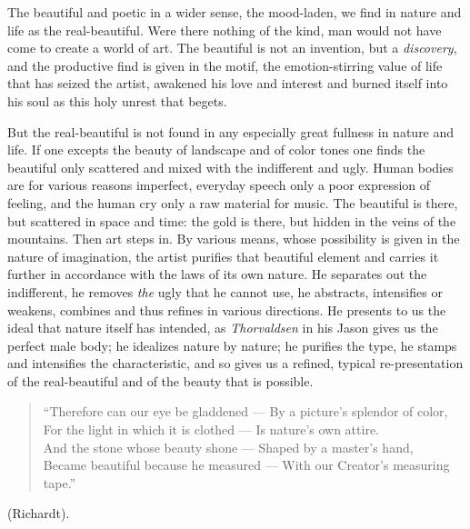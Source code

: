 \documentclass[12pt,a4paper,openany]{book}
\newcommand{\opage}[1]{\marginnote{\footnotesize\textit{[#1]}}}
\newenvironment{smallquote}{\begin{quote}}{\end{quote}}
\begin{document}
The beautiful and poetic in a wider sense, the mood-laden, we find in nature and life as
the real-beautiful. Were there nothing of the kind, man would not have come to create a %
world of art. The beautiful is not an invention, but a \emph{discovery}, and the
productive find is given in the motif, the emotion-stirring value of life that has seized
the artist, awakened his love and interest and burned itself into his soul as this holy
unrest that begets.

But the real-beautiful is not found in any especially great fullness in nature and
life. If one excepts the beauty of landscape and of color tones one finds the beautiful
only scattered and mixed with the indifferent and ugly. Human bodies are for various
reasons imperfect, everyday speech only a poor expression of feeling, and the human cry
only a raw material for music. The beautiful is there, but scattered in space and time:
the gold is there, but hidden in the veins of the mountains.
\setcounter{footnote}{0}%
\opage{265}Then art steps in. By various means, whose possibility is given in the nature of
imagination, the artist purifies that beautiful element and carries it further in accordance with
the laws of its own nature. He separates out the indifferent, he removes \emph{the} ugly
that he cannot use, he abstracts, intensifies or weakens, combines and thus refines in various
directions. He presents to us the ideal that nature itself has intended,
as \emph{Thorvaldsen} in his Jason gives us the perfect
male body; he idealizes nature by nature;
he purifies the type, he stamps and intensifies the
characteristic, and so gives us a refined, typical re-presentation of the real-beautiful and of the beauty that is possible.

\begin{smallquote}

``Therefore can our eye be gladdened --- By a picture's splendor of color,\\
For the light in which it is clothed --- Is nature's own attire.\\
And the stone whose beauty shone --- Shaped by a master's hand,\\
Became beautiful because he measured --- With our Creator's measuring tape.''
\end{smallquote}

(Richardt).
\end{document}
